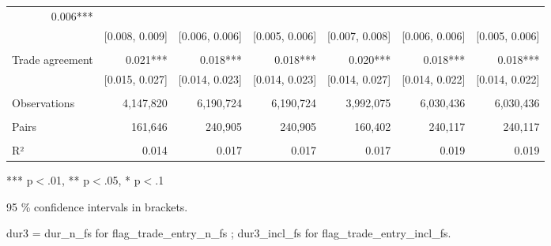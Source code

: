 \begin{table}[!h]
\begin{tabular}{lllllll}
  \multicolumn{1}{r}{0.006***} \\
\multicolumn{1}{l}{} &
  \multicolumn{1}{|r}{[0.008,   0.009]} &
  \multicolumn{1}{r}{[0.006,   0.006]} &
  \multicolumn{1}{r}{[0.005,   0.006]} &
  \multicolumn{1}{r}{[0.007,   0.008]} &
  \multicolumn{1}{r}{[0.006,   0.006]} &
  \multicolumn{1}{r}{[0.005,   0.006]} \\
\multicolumn{1}{l}{} &
  \multicolumn{1}{|r}{} &
  \multicolumn{1}{r}{} &
  \multicolumn{1}{r}{} &
  \multicolumn{1}{r}{} &
  \multicolumn{1}{r}{} &
  \multicolumn{1}{r}{} \\
\multicolumn{1}{l}{Trade agreement} &
  \multicolumn{1}{|r}{0.021***} &
  \multicolumn{1}{r}{0.018***} &
  \multicolumn{1}{r}{0.018***} &
  \multicolumn{1}{r}{0.020***} &
  \multicolumn{1}{r}{0.018***} &
  \multicolumn{1}{r}{0.018***} \\
\multicolumn{1}{l}{} &
  \multicolumn{1}{|r}{[0.015,   0.027]} &
  \multicolumn{1}{r}{[0.014,   0.023]} &
  \multicolumn{1}{r}{[0.014,   0.023]} &
  \multicolumn{1}{r}{[0.014,   0.027]} &
  \multicolumn{1}{r}{[0.014,   0.022]} &
  \multicolumn{1}{r}{[0.014,   0.022]} \\
\multicolumn{1}{l}{} &
  \multicolumn{1}{|r}{} &
  \multicolumn{1}{r}{} &
  \multicolumn{1}{r}{} &
  \multicolumn{1}{r}{} &
  \multicolumn{1}{r}{} &
  \multicolumn{1}{r}{} \\
\multicolumn{1}{l}{Observations} &
  \multicolumn{1}{|r}{4,147,820} &
  \multicolumn{1}{r}{6,190,724} &
  \multicolumn{1}{r}{6,190,724} &
  \multicolumn{1}{r}{3,992,075} &
  \multicolumn{1}{r}{6,030,436} &
  \multicolumn{1}{r}{6,030,436} \\
\multicolumn{1}{l}{} &
  \multicolumn{1}{|r}{} &
  \multicolumn{1}{r}{} &
  \multicolumn{1}{r}{} &
  \multicolumn{1}{r}{} &
  \multicolumn{1}{r}{} &
  \multicolumn{1}{r}{} \\
\multicolumn{1}{l}{Pairs} &
  \multicolumn{1}{|r}{161,646} &
  \multicolumn{1}{r}{240,905} &
  \multicolumn{1}{r}{240,905} &
  \multicolumn{1}{r}{160,402} &
  \multicolumn{1}{r}{240,117} &
  \multicolumn{1}{r}{240,117} \\
\multicolumn{1}{l}{} &
  \multicolumn{1}{|r}{} &
  \multicolumn{1}{r}{} &
  \multicolumn{1}{r}{} &
  \multicolumn{1}{r}{} &
  \multicolumn{1}{r}{} &
  \multicolumn{1}{r}{} \\
\multicolumn{1}{l}{R²} &
  \multicolumn{1}{|r}{0.014} &
  \multicolumn{1}{r}{0.017} &
  \multicolumn{1}{r}{0.017} &
  \multicolumn{1}{r}{0.017} &
  \multicolumn{1}{r}{0.019} &
  \multicolumn{1}{r}{0.019} \\
\cline{1-7}
\end{tabular}

\footnotesize{
*** p$<$.01, ** p$<$.05, * p$<$.1

95 \% confidence intervals in brackets.

dur3 = dur\_n\_fs for flag\_trade\_entry\_n\_fs ; dur3\_incl\_fs for flag\_trade\_entry\_incl\_fs.
}
\end{table}
